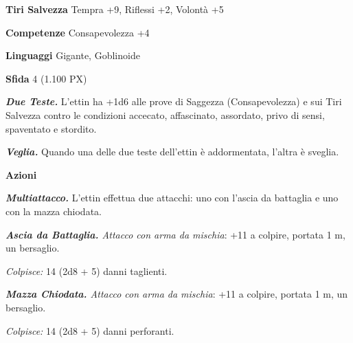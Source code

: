 \begin{multicols}{2}
\textbf{Tiri Salvezza} Tempra +9, Riflessi +2, Volontà +5

\textbf{Competenze} Consapevolezza +4

\textbf{Linguaggi} Gigante, Goblinoide

\textbf{Sfida} 4 (1.100 PX)

\textit{\textbf{Due Teste.}} L'ettin ha +1d6 alle prove di Saggezza (Consapevolezza) e sui Tiri Salvezza contro le condizioni accecato, affascinato, assordato, privo di sensi, spaventato e stordito.

\textit{\textbf{Veglia.}} Quando una delle due teste dell'ettin è addormentata, l'altra è sveglia.

\textbf{Azioni}

\textit{\textbf{Multiattacco.}} L'ettin effettua due attacchi: uno con l'ascia da battaglia e uno con la mazza chiodata.

\textit{\textbf{Ascia da Battaglia.} Attacco con arma da mischia}: +11 a colpire, portata 1 m, un bersaglio.

\textit{Colpisce:} 14 (2d8 + 5) danni taglienti.

\textit{\textbf{Mazza Chiodata.} Attacco con arma da mischia}: +11 a colpire, portata 1 m, un bersaglio.

\textit{Colpisce:} 14 (2d8 + 5) danni perforanti.


\end{multicols}
